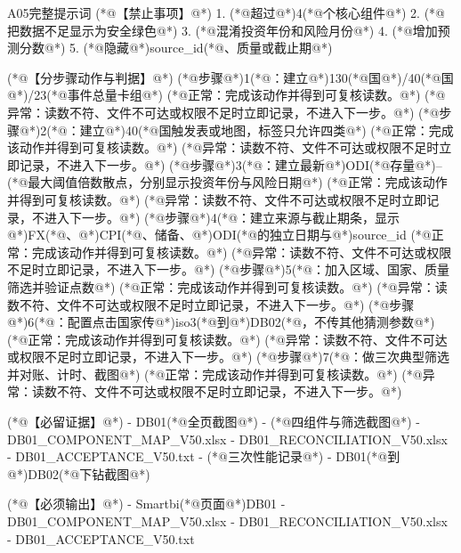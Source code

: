 \documentclass[UTF8,openany,zihao=-4]{ctexbook}
\renewcommand{\_}{\textunderscore\allowbreak}
\begin{document}
\begin{PromptBox}{A05完整提示词}
(*@{\promptcjk 【禁止事项】}@*)
1. (*@{\promptcjk 超过}@*)4(*@{\promptcjk 个核心组件}@*)
2. (*@{\promptcjk 把数据不足显示为安全绿色}@*)
3. (*@{\promptcjk 混淆投资年份和风险月份}@*)
4. (*@{\promptcjk 增加预测分数}@*)
5. (*@{\promptcjk 隐藏}@*)source_id(*@{\promptcjk 、质量或截止期}@*)

(*@{\promptcjk 【分步骤动作与判据】}@*)
(*@{\promptcjk 步骤}@*)1(*@{\promptcjk ：建立}@*)130(*@{\promptcjk 国}@*)/40(*@{\promptcjk 国}@*)/23(*@{\promptcjk 事件总量卡组}@*)
  (*@{\promptcjk 正常：完成该动作并得到可复核读数。}@*)
  (*@{\promptcjk 异常：读数不符、文件不可达或权限不足时立即记录，不进入下一步。}@*)
(*@{\promptcjk 步骤}@*)2(*@{\promptcjk ：建立}@*)40(*@{\promptcjk 国触发表或地图，标签只允许四类}@*)
  (*@{\promptcjk 正常：完成该动作并得到可复核读数。}@*)
  (*@{\promptcjk 异常：读数不符、文件不可达或权限不足时立即记录，不进入下一步。}@*)
(*@{\promptcjk 步骤}@*)3(*@{\promptcjk ：建立最新}@*)ODI(*@{\promptcjk 存量}@*)--(*@{\promptcjk 最大阈值倍数散点，分别显示投资年份与风险日期}@*)
  (*@{\promptcjk 正常：完成该动作并得到可复核读数。}@*)
  (*@{\promptcjk 异常：读数不符、文件不可达或权限不足时立即记录，不进入下一步。}@*)
(*@{\promptcjk 步骤}@*)4(*@{\promptcjk ：建立来源与截止期条，显示}@*)FX(*@{\promptcjk 、}@*)CPI(*@{\promptcjk 、储备、}@*)ODI(*@{\promptcjk 的独立日期与}@*)source_id
  (*@{\promptcjk 正常：完成该动作并得到可复核读数。}@*)
  (*@{\promptcjk 异常：读数不符、文件不可达或权限不足时立即记录，不进入下一步。}@*)
(*@{\promptcjk 步骤}@*)5(*@{\promptcjk ：加入区域、国家、质量筛选并验证点数}@*)
  (*@{\promptcjk 正常：完成该动作并得到可复核读数。}@*)
  (*@{\promptcjk 异常：读数不符、文件不可达或权限不足时立即记录，不进入下一步。}@*)
(*@{\promptcjk 步骤}@*)6(*@{\promptcjk ：配置点击国家传}@*)iso3(*@{\promptcjk 到}@*)DB02(*@{\promptcjk ，不传其他猜测参数}@*)
  (*@{\promptcjk 正常：完成该动作并得到可复核读数。}@*)
  (*@{\promptcjk 异常：读数不符、文件不可达或权限不足时立即记录，不进入下一步。}@*)
(*@{\promptcjk 步骤}@*)7(*@{\promptcjk ：做三次典型筛选并对账、计时、截图}@*)
  (*@{\promptcjk 正常：完成该动作并得到可复核读数。}@*)
  (*@{\promptcjk 异常：读数不符、文件不可达或权限不足时立即记录，不进入下一步。}@*)

(*@{\promptcjk 【必留证据】}@*)
- DB01(*@{\promptcjk 全页截图}@*)
- (*@{\promptcjk 四组件与筛选截图}@*)
- DB01_COMPONENT_MAP_V50.xlsx
- DB01_RECONCILIATION_V50.xlsx
- DB01_ACCEPTANCE_V50.txt
- (*@{\promptcjk 三次性能记录}@*)
- DB01(*@{\promptcjk 到}@*)DB02(*@{\promptcjk 下钻截图}@*)

(*@{\promptcjk 【必须输出】}@*)
- Smartbi(*@{\promptcjk 页面}@*)DB01
- DB01_COMPONENT_MAP_V50.xlsx
- DB01_RECONCILIATION_V50.xlsx
- DB01_ACCEPTANCE_V50.txt


\end{PromptBox}
\end{document}
